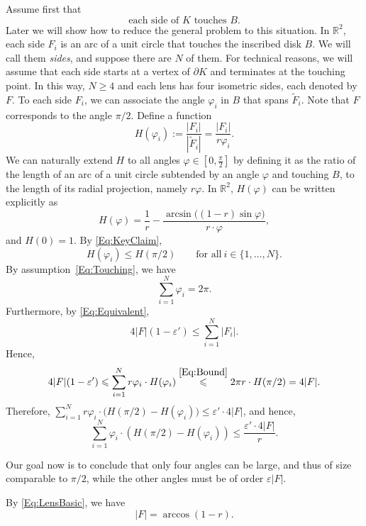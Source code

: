 \documentclass[11pt, oneside]{amsart}
\newcommand{\R}{\mathbb{R}}
\renewcommand{\tilde}{\widetilde}
\renewcommand{\phi}{\varphi}
\newcommand{\eps}{\varepsilon}
\renewcommand{\ge}{\geqslant}
\renewcommand{\le}{\leqslant}
\theoremstyle{theorem}
\theoremstyle{Intro}
\theoremstyle{definition}
\theoremstyle{remark}
\theoremstyle{claim}
\numberwithin{equation}{section}
\begin{document}
Assume first that 
\begin{equation}
\label{Eq:Touching}
\text{each side of $K$ touches $B$}.
\end{equation}
Later we will show how to reduce the general problem to this situation. In $\R^2$, each side $F_i$ is an arc of a unit circle that touches the inscribed disk $B$. We will call them \emph{sides}, and suppose there are $N$ of them. For technical reasons, we will assume that each side starts at a vertex of $\partial K$ and terminates at the touching point. In this way, $N \ge 4$ and each lens has four isometric sides, each denoted by $F$. To each side $F_i$, we can associate the angle $\phi_i$ in $B$ that spans $\tilde F_i$. Note that $F$ corresponds to the angle $\pi/2$. Define a function
\[
H(\phi_i) := \frac{|F_i|}{|\tilde F_i|} = \frac{|F_i|}{r \phi_i}.
\] 
We can naturally extend $H$ to all angles $\phi \in [0, \frac{\pi}2]$ by defining it as the ratio of the length of an arc of a unit circle subtended by an angle $\phi$ and touching $B$,  to the length of its radial projection, namely $r\phi$. In $\mathbb{R}^2$, $H(\phi)$ can be written explicitly as
\[
H(\phi) = \frac{1}{r} - \frac{\arcsin\big((1-r)\sin \phi \big)}{r \cdot \phi},
\]
and $H(0) = 1.$ By \eqref{Eq:KeyClaim}, %
\begin{equation}
\label{Eq:Bound}
H(\phi_i) \le H(\pi/2) \qquad \text{for all} \  i \in \{1, \ldots, N\}.
\end{equation}
By assumption~\eqref{Eq:Touching}, we have
\begin{equation}
\label{Eq:Sum}
\sum_{i = 1}^N \phi_i = 2\pi.
\end{equation}
Furthermore, by \eqref{Eq:Equivalent}, 
\[
4|F| (1 - \eps') \le \sum_{i=1}^N |F_i|.
\]
Hence,
\[
4|F| (1 - \eps') \le \sum_{i=1}^N r \phi_i \cdot H(\phi_i) \overset{\eqref{Eq:Bound}}{\le} 2 \pi r \cdot H(\pi/2) = 4 |F|.
\]
Therefore, $\sum_{i=1}^N r \phi_i \cdot \big(H(\pi/2) - H(\phi_i)\big) \le \eps' \cdot 4|F|$, and hence,
\begin{equation}
\label{Eq:Alternative}
\sum_{i=1}^N \phi_i \cdot (H(\pi/2) - H(\phi_i)) \le \frac{\eps' \cdot 4|F|}{r}. 
\end{equation}

Our goal now is to conclude that only four angles
can be large, and thus of size comparable to $\pi/2$, while the other angles must be of order $\eps |F|$.

By \eqref{Eq:LensBasic}, we have
\[
|F| = \arccos(1-r).
\]
\end{document}
